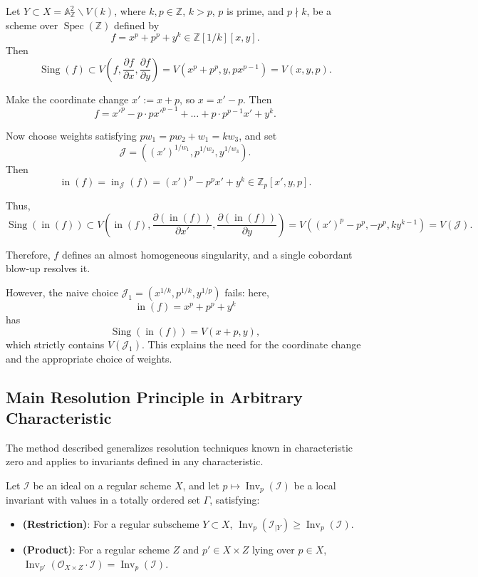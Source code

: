 \documentclass{amsart}
\newcommand{\ZZ}{{\mathbb{Z}}}
\renewcommand{\AA}{{\mathbb{A}}}
\newcommand{\cI}{{\mathcal I}}
\newcommand{\cJ}{{\mathcal J}}
\newcommand{\cO}{{\mathcal O}}
\newcommand{\inn}{\operatorname{in}}
\newcommand{\Spec}{\operatorname{Spec}}
\newcommand{\Sing}{{\operatorname{Sing}}}
\renewcommand{\setminus}{\smallsetminus}
\newcommand{\Inv}{{\operatorname{Inv}}}
\begin{document}
\begin{example}
Let $Y \subset X = \AA^2_{\ZZ} \setminus V(k)$, where $k, p \in \ZZ$, $k > p$, $p$ is prime, and $p \nmid k$, be a scheme over $\Spec(\ZZ)$ defined by
\[
f = x^p + p^p + y^k \in \ZZ[1/k][x, y].
\]
Then
\[
\Sing(f) \subset V\left(f, \frac{\partial f}{\partial x}, \frac{\partial f}{\partial y}\right)
= V(x^p + p^p, y, px^{p-1})
= V(x, y, p).
\]

Make the coordinate change $x' := x + p$, so $x = x' - p$. Then
\[
f = {x'}^p - p \cdot p {x'}^{p-1} + \ldots + p \cdot p^{p-1} x' + y^k.
\]

Now choose weights satisfying $p w_1 = p w_2 + w_1 = k w_3$, and set
\[
\cJ = \left((x')^{1/w_1}, p^{1/w_2}, y^{1/w_3}\right).
\]
Then
\[
\inn(f) = \inn_{\cJ}(f)
= (x')^p - p^p x' + y^k \in \ZZ_p[x', y, p].
\]

Thus,
\[
\Sing(\inn(f)) \subset V\left(\inn(f), \frac{\partial (\inn(f))}{\partial x'}, \frac{\partial (\inn(f))}{\partial y}\right)
= V((x')^p - p^p, -p^p, ky^{k-1})
= V(\cJ).
\]

Therefore, $f$ defines an almost homogeneous singularity, and a single cobordant blow-up resolves it.

However, the naive choice $\cJ_1 = (x^{1/k}, p^{1/k}, y^{1/p})$ fails: here,
\[
\inn(f) = x^p + p^p + y^k
\]
has
\[
\Sing(\inn(f)) = V(x + p, y),
\]
which strictly contains $V(\cJ_1)$. This explains the need for the coordinate change and the appropriate choice of weights.
\end{example}

\subsection{Main Resolution Principle in Arbitrary Characteristic}

The method described generalizes resolution techniques known in characteristic zero and applies to invariants defined in any characteristic.

Let $\cI$ be an ideal on a regular scheme $X$, and let $p \mapsto \Inv_p(\cI)$ be a local invariant with values in a totally ordered set $\Gamma$, satisfying:
\begin{itemize}
  \item \textbf{(Restriction)}: For a regular subscheme $Y \subset X$,  
  $\Inv_p(\cI_{|Y}) \geq \Inv_p(\cI)$.
  \item \textbf{(Product)}: For a regular scheme $Z$ and $p' \in X \times Z$ lying over $p \in X$,  
  $\Inv_{p'}(\cO_{X \times Z} \cdot \cI) = \Inv_p(\cI)$.
\end{itemize}
\end{document}
